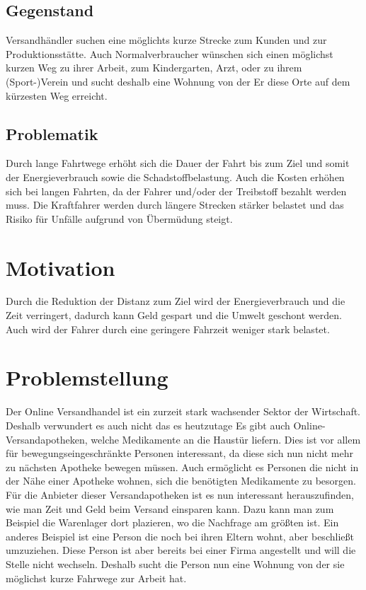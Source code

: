 \documentclass[a4paper, 12pt]{scrreprt}
\begin{document}
\subsection{Gegenstand}
Versandhändler suchen eine möglichts kurze Strecke zum Kunden und zur Produktionsstätte.
Auch Normalverbraucher wünschen sich einen möglichst kurzen Weg zu ihrer Arbeit, zum Kindergarten, Arzt, oder zu ihrem (Sport-)Verein und sucht deshalb eine Wohnung von der Er diese Orte auf dem kürzesten Weg erreicht.
\subsection{Problematik}
Durch lange Fahrtwege erhöht sich die Dauer der Fahrt bis zum Ziel und somit der Energieverbrauch sowie die Schadstoffbelastung.
Auch die Kosten erhöhen sich bei langen Fahrten, da der Fahrer und/oder der Treibstoff bezahlt werden muss.
Die Kraftfahrer werden durch längere Strecken stärker belastet und das Risiko für Unfälle aufgrund von Übermüdung steigt.\cite{hoffmann1966belastung}
\section{Motivation}
Durch die Reduktion der Distanz zum Ziel wird der Energieverbrauch und die Zeit verringert, dadurch kann Geld gespart und die Umwelt geschont werden.
Auch wird der Fahrer durch eine geringere Fahrzeit weniger stark belastet.
\section{Problemstellung}
Der Online Versandhandel ist ein zurzeit stark wachsender Sektor der Wirtschaft.\cite{Stepper2016}
Deshalb verwundert es auch nicht das es heutzutage
Es gibt auch Online-Versandapotheken, welche Medikamente an die Haustür liefern.
Dies ist vor allem für bewegungseingeschränkte Personen interessant, da diese sich nun nicht mehr zu nächsten Apotheke bewegen müssen.
Auch ermöglicht es Personen die nicht in der Nähe einer Apotheke wohnen, sich die benötigten Medikamente zu besorgen.
Für die Anbieter dieser Versandapotheken ist es nun interessant herauszufinden, wie man Zeit und Geld beim Versand einsparen kann.
Dazu kann man zum Beispiel die Warenlager dort plazieren, wo die Nachfrage am größten ist.
Ein anderes Beispiel ist eine Person die noch bei ihren Eltern wohnt, aber beschließt umzuziehen.
Diese Person ist aber bereits bei einer Firma angestellt und will die Stelle nicht wechseln.
Deshalb sucht die Person nun eine Wohnung von der sie möglichst kurze Fahrwege zur Arbeit hat.
\end{document}
